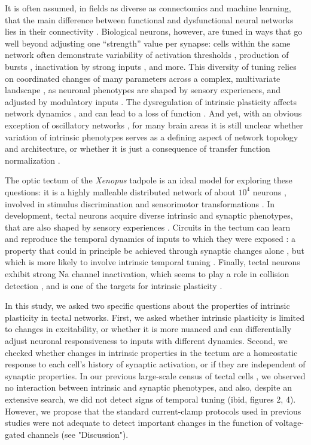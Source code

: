 \documentclass{article}
\begin{document}
It is often assumed, in fields as diverse as connectomics and machine learning, that the main difference between functional and dysfunctional neural networks lies in their connectivity \citep{takemura2014,hildebrand2017,bassett2017network,reimann2017}. Biological neurons, however, are tuned in ways that go well beyond adjusting one “strength” value per synapse: cells within the same network often demonstrate variability of activation thresholds \citep{kole2012}, production of bursts \citep{popovic2011}, inactivation by strong inputs \citep{bianchi2012}, and more. This diversity of tuning relies on coordinated changes of many parameters across a complex, multivariate landscape \citep{oleary2013}, as neuronal phenotypes are shaped by sensory experiences, and adjusted by modulatory inputs \citep{evans2015}. The dysregulation of intrinsic plasticity affects network dynamics \citep{tien2018}, and can lead to a loss of function \citep{marcelin2009}. And yet, with an obvious exception of oscillatory networks \citep{marder2011,picton2018control}, for many brain areas it is still unclear whether variation of intrinsic phenotypes serves as a defining aspect of network topology and architecture, or whether it is just a consequence of transfer function normalization \citep{titley2017}.

The optic tectum of the \textit{Xenopus} tadpole is an ideal model for exploring these questions: it is a highly malleable distributed network of about $10^4$ neurons \citep{pratt2013}, involved in stimulus discrimination and sensorimotor transformations \citep{dong2009,khakhalin2014}. In development, tectal neurons acquire diverse intrinsic and synaptic phenotypes, that are also shaped by sensory experiences \citep{xu2011,ciarleglio2015}. Circuits in the tectum can learn and reproduce the temporal dynamics of inputs to which they were exposed \citep{pratt2008}: a property that could in principle be achieved through synaptic changes alone \citep{lukovsevivcius2009}, but which is more likely to involve intrinsic temporal tuning \citep{narayanan2008,beatty2014}. Finally, tectal neurons exhibit strong Na channel inactivation, which seems to play a role in collision detection \citep{jang2016}, and is one of the targets for intrinsic plasticity \citep{bianchi2012}.

In this study, we asked two specific questions about the properties of intrinsic plasticity in tectal networks. First, we asked whether intrinsic plasticity is limited to changes in excitability, or whether it is more nuanced and can differentially adjust neuronal responsiveness to inputs with different dynamics. Second, we checked whether changes in intrinsic properties in the tectum are a homeostatic response to each cell's history of synaptic activation, or if they are independent of synaptic properties. In our previous large-scale census of tectal cells \citep{ciarleglio2015}, we observed no interaction between intrinsic and synaptic phenotypes, and also, despite an extensive search, we did not detect signs of temporal tuning (ibid,  figures 2, 4). However, we propose that the standard current-clamp protocols used in previous studies \citep{pratt2007,hamodi2014} were not adequate to detect important changes in the function of voltage-gated channels (see "Discussion"). 
\end{document}
